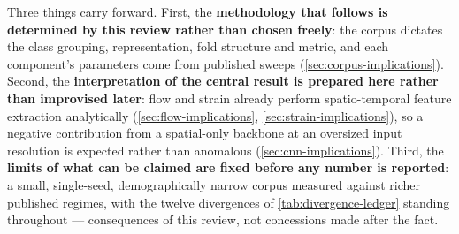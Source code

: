 Three things carry forward. First, the \textbf{methodology that follows is determined by this review rather than chosen freely}: the corpus dictates the class grouping, representation, fold structure and metric, and each component's parameters come from published sweeps (\autoref{sec:corpus-implications}). Second, the \textbf{interpretation of the central result is prepared here rather than improvised later}: flow and strain already perform spatio-temporal feature extraction analytically (\autoref{sec:flow-implications}, \autoref{sec:strain-implications}), so a negative contribution from a spatial-only backbone at an oversized input resolution is expected rather than anomalous (\autoref{sec:cnn-implications}). Third, the \textbf{limits of what can be claimed are fixed before any number is reported}: a small, single-seed, demographically narrow corpus measured against richer published regimes, with the twelve divergences of \autoref{tab:divergence-ledger} standing throughout --- consequences of this review, not concessions made after the fact.
